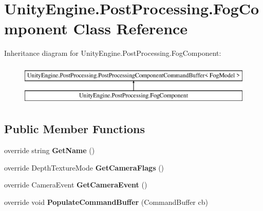 \hypertarget{class_unity_engine_1_1_post_processing_1_1_fog_component}{}\section{Unity\+Engine.\+Post\+Processing.\+Fog\+Component Class Reference}
\label{class_unity_engine_1_1_post_processing_1_1_fog_component}
Inheritance diagram for Unity\+Engine.\+Post\+Processing.\+Fog\+Component\+:\begin{figure}[H]
\begin{center}
\leavevmode
\includegraphics[height=2.000000cm]{class_unity_engine_1_1_post_processing_1_1_fog_component}
\end{center}
\end{figure}
\subsection*{Public Member Functions}
\begin{DoxyCompactItemize}
\item 
\mbox{\label{class_unity_engine_1_1_post_processing_1_1_fog_component_acf525749b7d7e54b04a111681b386628}} 
override string {\bfseries Get\+Name} ()
\item 
\mbox{\label{class_unity_engine_1_1_post_processing_1_1_fog_component_a91738868bb041aaecca8adcf75c148c3}} 
override Depth\+Texture\+Mode {\bfseries Get\+Camera\+Flags} ()
\item 
\mbox{\label{class_unity_engine_1_1_post_processing_1_1_fog_component_a6b9fae58f8772759a33c8050ea443195}} 
override Camera\+Event {\bfseries Get\+Camera\+Event} ()
\item 
\mbox{\label{class_unity_engine_1_1_post_processing_1_1_fog_component_a069c63fdf3cc8cc505508db2671948ac}} 
override void {\bfseries Populate\+Command\+Buffer} (Command\+Buffer cb)
\end{DoxyCompactItemize}
